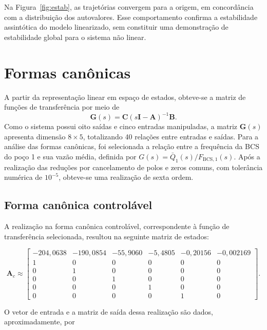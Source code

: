 \documentclass[10pt,a4paper]{article}
\newcommand{\mat}[1]{\mathbf{#1}}
\newcommand{\bcs}{\mathrm{BCS}}
\begin{document}
Na Figura~\ref{fig:estab}, as trajetórias convergem para a origem, em concordância com a distribuição dos autovalores. Esse comportamento confirma a estabilidade assintótica do modelo linearizado, sem constituir uma demonstração de estabilidade global para o sistema não linear.

\section{Formas canônicas}
A partir da representação linear em espaço de estados, obteve-se a matriz de funções de transferência por meio de
\begin{equation}
\mat{G}(s)=\mat{C}(s\mat{I}-\mat{A})^{-1}\mat{B}.\label{eq:tf}
\end{equation}
Como o sistema possui oito saídas e cinco entradas manipuladas, a matriz $\mat{G}(s)$ apresenta dimensão $8\times5$, totalizando 40 relações entre entradas e saídas. Para a análise das formas canônicas, foi selecionada a relação entre a frequência da BCS do poço 1 e sua vazão média, definida por $G(s)=\bar Q_1(s)/F_{\bcs,1}(s)$. Após a realização das reduções por cancelamento de polos e zeros comuns, com tolerância numérica de $10^{-5}$, obteve-se uma realização de sexta ordem.


\subsection{Forma canônica controlável}

A realização na forma canônica controlável, correspondente à função de transferência selecionada, resultou na seguinte matriz de estados:

\begingroup
\small
\setlength{\arraycolsep}{3pt}
\begin{equation}
\mat{A}_{c}\approx
\begin{bmatrix}
-204{,}0638 & -190{,}0854 & -55{,}9060 & -5{,}4805 & -0{,}20156 & -0{,}002169\\
1 & 0 & 0 & 0 & 0 & 0\\
0 & 1 & 0 & 0 & 0 & 0\\
0 & 0 & 1 & 0 & 0 & 0\\
0 & 0 & 0 & 1 & 0 & 0\\
0 & 0 & 0 & 0 & 1 & 0
\end{bmatrix}.
\label{eq:Ac}
\end{equation}
\endgroup

O vetor de entrada e a matriz de saída dessa realização são dados, aproximadamente, por
\end{document}
